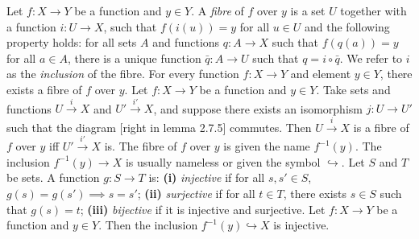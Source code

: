  Let $f \colon X \to Y$ be a function and $y \in Y$. A \textit{fibre} of $f$ over $y$ is a set $U$ together with a function $i \colon U \to X$, such that $f(i(u)) = y$ for all $u \in U$ and the following property holds: for all sets $A$ and functions $q \colon A \to X$ such that $f(q(a)) = y$ for all $a \in A$, there is a unique function $\bar{q} \colon A \to U$ such that $q = i \circ \bar{q}$. We refer to $i$ as the \textit{inclusion} of the fibre.
 For every function $f \colon X \to Y$ and element $y \in Y$, there exists a fibre of $f$ over $y$.
 Let $f \colon X \to Y$ be a function and $y \in Y$. Take sets and functions $U \xrightarrow{i} X$ and $U' \xrightarrow{i'} X$, and suppose there exists an isomorphism $j \colon U \to U'$ such that the diagram [right in lemma 2.7.5] commutes. Then $U \xrightarrow{i} X$ is a fibre of $f$ over $y$ iff $U' \xrightarrow{i'} X$ is.
 The fibre of $f$ over $y$ is given the name $f^{-1}(y)$. The inclusion $f^{-1}(y) \to X$ is usually nameless or given the symbol $\hookrightarrow$.
 Let $S$ and $T$ be sets. A function $g \colon S \to T$ is: \textbf{(i)} \textit{injective} if for all $s, s' \in S$, $g(s) = g(s') \implies s = s'$; \textbf{(ii)} \textit{surjective} if for all $t \in T$, there exists $s \in S$ such that $g(s) = t$; \textbf{(iii)} \textit{bijective} if it is injective and surjective.
 Let $f \colon X \to Y$ be a function and $y \in Y$. Then the inclusion $f^{-1}(y) \hookrightarrow X$ is injective.